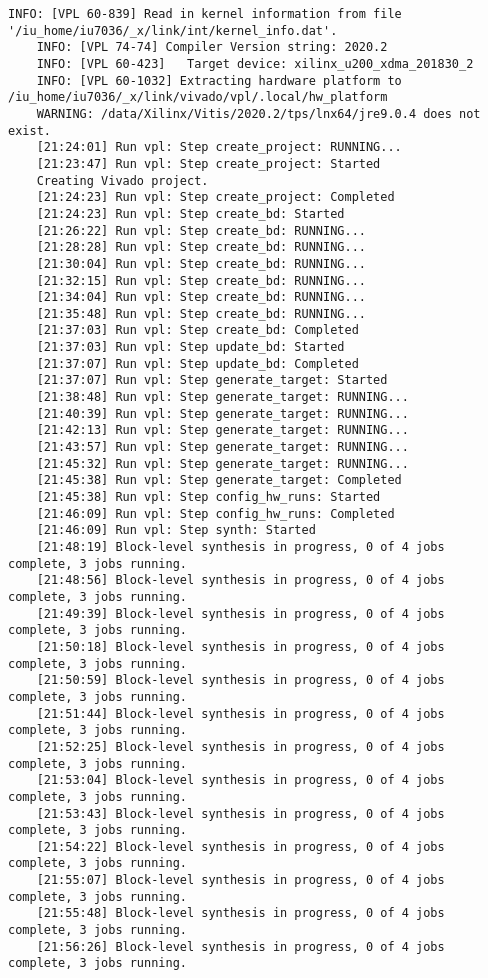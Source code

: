\begin{lstlisting}[caption=Содержимое файла v++\_vinc.log для измененного проекта, label={log2}]
	INFO: [VPL 60-839] Read in kernel information from file '/iu_home/iu7036/_x/link/int/kernel_info.dat'.
	INFO: [VPL 74-74] Compiler Version string: 2020.2
	INFO: [VPL 60-423]   Target device: xilinx_u200_xdma_201830_2
	INFO: [VPL 60-1032] Extracting hardware platform to /iu_home/iu7036/_x/link/vivado/vpl/.local/hw_platform
	WARNING: /data/Xilinx/Vitis/2020.2/tps/lnx64/jre9.0.4 does not exist.
	[21:24:01] Run vpl: Step create_project: RUNNING...
	[21:23:47] Run vpl: Step create_project: Started
	Creating Vivado project.
	[21:24:23] Run vpl: Step create_project: Completed
	[21:24:23] Run vpl: Step create_bd: Started
	[21:26:22] Run vpl: Step create_bd: RUNNING...
	[21:28:28] Run vpl: Step create_bd: RUNNING...
	[21:30:04] Run vpl: Step create_bd: RUNNING...
	[21:32:15] Run vpl: Step create_bd: RUNNING...
	[21:34:04] Run vpl: Step create_bd: RUNNING...
	[21:35:48] Run vpl: Step create_bd: RUNNING...
	[21:37:03] Run vpl: Step create_bd: Completed
	[21:37:03] Run vpl: Step update_bd: Started
	[21:37:07] Run vpl: Step update_bd: Completed
	[21:37:07] Run vpl: Step generate_target: Started
	[21:38:48] Run vpl: Step generate_target: RUNNING...
	[21:40:39] Run vpl: Step generate_target: RUNNING...
	[21:42:13] Run vpl: Step generate_target: RUNNING...
	[21:43:57] Run vpl: Step generate_target: RUNNING...
	[21:45:32] Run vpl: Step generate_target: RUNNING...
	[21:45:38] Run vpl: Step generate_target: Completed
	[21:45:38] Run vpl: Step config_hw_runs: Started
	[21:46:09] Run vpl: Step config_hw_runs: Completed
	[21:46:09] Run vpl: Step synth: Started
	[21:48:19] Block-level synthesis in progress, 0 of 4 jobs complete, 3 jobs running.
	[21:48:56] Block-level synthesis in progress, 0 of 4 jobs complete, 3 jobs running.
	[21:49:39] Block-level synthesis in progress, 0 of 4 jobs complete, 3 jobs running.
	[21:50:18] Block-level synthesis in progress, 0 of 4 jobs complete, 3 jobs running.
	[21:50:59] Block-level synthesis in progress, 0 of 4 jobs complete, 3 jobs running.
	[21:51:44] Block-level synthesis in progress, 0 of 4 jobs complete, 3 jobs running.
	[21:52:25] Block-level synthesis in progress, 0 of 4 jobs complete, 3 jobs running.
	[21:53:04] Block-level synthesis in progress, 0 of 4 jobs complete, 3 jobs running.
	[21:53:43] Block-level synthesis in progress, 0 of 4 jobs complete, 3 jobs running.
	[21:54:22] Block-level synthesis in progress, 0 of 4 jobs complete, 3 jobs running.
	[21:55:07] Block-level synthesis in progress, 0 of 4 jobs complete, 3 jobs running.
	[21:55:48] Block-level synthesis in progress, 0 of 4 jobs complete, 3 jobs running.
	[21:56:26] Block-level synthesis in progress, 0 of 4 jobs complete, 3 jobs running.

\end{lstlisting}
